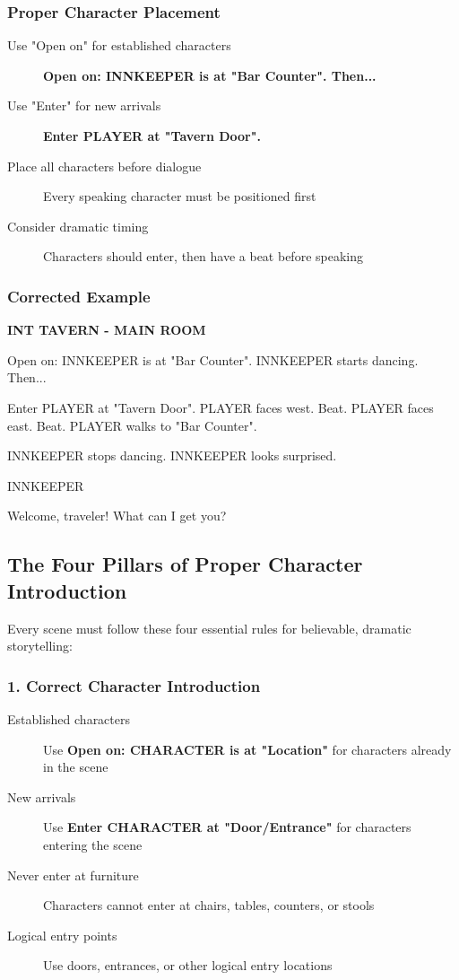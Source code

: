 \documentclass[11pt,letterpaper,oldstylefigures]{memoir}
\newcommand{\slugline}[1]{\nobreak\textbf{\MakeUppercase{#1}}\par\nobreak\vspace{1\baselineskip}}
\newcommand{\speaker}[1]{\nobreak\hspace*{0.333\textwidth}\MakeUppercase{#1}\par\nobreak\vspace{0.5\baselineskip}}
\newcommand{\dialogue}[1]{\nobreak\hspace*{0.25\textwidth}\begin{minipage}{0.5\textwidth}#1\end{minipage}\par\vspace{1\baselineskip}}
\newcommand{\stagedir}[1]{#1\par\vspace{1\baselineskip}}
\newenvironment{FountainExample}
  {\begingroup
  \ttfamily\small
   \setlength{\parindent}{0pt}
  \setlength{\parskip}{0.5em}
  \allowdisplaybreaks
  \setlength{\displaywidowpenalty}{0}
  \setlength{\widowpenalty}{0}
  \setlength{\clubpenalty}{0}
  \setlength{\interlinepenalty}{0}
}
  {\endgroup}
\newcommand{\fountain}[1]{\textbf{#1}}
\begin{document}
\subsubsection{Proper Character Placement}
\begin{description}
\item[Use "Open on" for established characters] \fountain{Open on: INNKEEPER is at "Bar Counter". Then...}
\item[Use "Enter" for new arrivals] \fountain{Enter PLAYER at "Tavern Door".}
\item[Place all characters before dialogue] Every speaking character must be positioned first
\item[Consider dramatic timing] Characters should enter, then have a beat before speaking
\end{description}


\subsubsection{Corrected Example}
\begin{FountainExample}
\slugline{INT TAVERN - MAIN ROOM}

\stagedir{Open on: INNKEEPER is at "Bar Counter". INNKEEPER starts dancing. Then...}
\stagedir{Enter PLAYER at "Tavern Door". PLAYER faces west. Beat. PLAYER faces east. Beat. PLAYER walks to "Bar Counter".}

\stagedir{INNKEEPER stops dancing. INNKEEPER looks surprised.}

\speaker{INNKEEPER}
\dialogue{Welcome, traveler! What can I get you?}
\end{FountainExample}


\subsection{The Four Pillars of Proper Character Introduction}

Every scene must follow these four essential rules for believable, dramatic storytelling:

\subsubsection{1. Correct Character Introduction}
\begin{description}
\item[Established characters] Use \fountain{Open on: CHARACTER is at "Location"} for characters already in the scene
\item[New arrivals] Use \fountain{Enter CHARACTER at "Door/Entrance"} for characters entering the scene
\item[Never enter at furniture] Characters cannot enter at chairs, tables, counters, or stools
\item[Logical entry points] Use doors, entrances, or other logical entry locations
\end{description}
\end{document}
